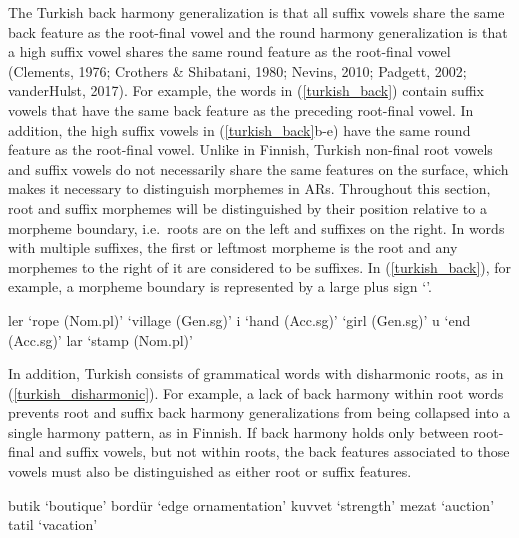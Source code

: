 \documentclass[,doc,floatsintext]{apa6}
\theoremstyle{definition}
\theoremstyle{definition}
\theoremstyle{definition}
\theoremstyle{remark}
\begin{document}
The Turkish back harmony generalization is that all suffix vowels share
the same back feature as the root-final vowel and the round harmony
generalization is that a high suffix vowel shares the same round feature
as the root-final vowel (Clements, 1976; Crothers \& Shibatani, 1980;
Nevins, 2010; Padgett, 2002; vanderHulst, 2017). For example, the words
in (\ref{turkish_back}) contain suffix vowels that have the same back
feature as the preceding root-final vowel. In addition, the high suffix
vowels in (\ref{turkish_back}b-e) have the same round feature as the
root-final vowel. Unlike in Finnish, Turkish non-final root vowels and
suffix vowels do not necessarily share the same features on the surface,
which makes it necessary to distinguish morphemes in ARs. Throughout
this section, root and suffix morphemes will be distinguished by their
position relative to a morpheme boundary, i.e.~roots are on the left and
suffixes on the right. In words with multiple suffixes, the first or
leftmost morpheme is the root and any morphemes to the right of it are
considered to be suffixes. In (\ref{turkish_back}), for example, a
morpheme boundary is represented by a large plus sign
`\textipa{\LARGE+}'. \newpage

\begin{exe}
\label{turkish_back} 
\begin{xlist}
  \ex {}ler `rope (Nom.pl)'
  \ex {} `village (Gen.sg)'
  \ex {}i   `hand (Acc.sg)'
  \ex {} `girl (Gen.sg)'
  \ex {}u  `end (Acc.sg)'
  \ex {}lar `stamp (Nom.pl)'
\end{xlist}
\end{exe}

In addition, Turkish consists of grammatical words with disharmonic
roots, as in (\ref{turkish_disharmonic}). For example, a lack of back
harmony within root words prevents root and suffix back harmony
generalizations from being collapsed into a single harmony pattern, as
in Finnish. If back harmony holds only between root-final and suffix
vowels, but not within roots, the back features associated to those
vowels must also be distinguished as either root or suffix features.

\begin{exe}
\label{turkish_disharmonic} 
\begin{xlist}
  \ex butik   `boutique'
  \ex bordür  `edge ornamentation'
  \ex kuvvet  `strength'
  \ex mezat   `auction'
  \ex tatil   `vacation'
\end{xlist}
\end{exe}
\end{document}

